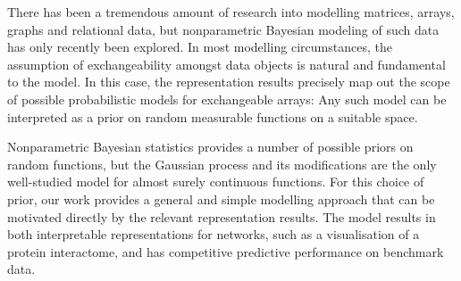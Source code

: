 There has been a tremendous amount of research into modelling matrices, arrays, graphs and relational data, but nonparametric
Bayesian modeling of such data has only recently been explored.
In most modelling circumstances, the assumption of exchangeability amongst data objects is natural and fundamental to the model.
In this case, the representation results 
\citep{ldous1981-lg,Hoover1979-br,Kallenberg1992-gb} 
precisely map out the scope of possible probabilistic models for exchangeable arrays:
Any such model can be interpreted as a prior on random measurable functions on a suitable space.

Nonparametric Bayesian statistics provides a number of possible priors on random functions, but the Gaussian process
and its modifications are the only well-studied model for almost surely continuous functions.
For this choice of prior, our work provides a general and simple modelling approach that can be motivated directly by the
relevant representation results.
The model results in both interpretable representations for networks, such as a visualisation of a protein interactome, and has 
competitive predictive performance on benchmark data.



\outbpdocument{


}

